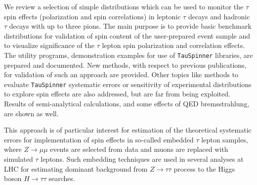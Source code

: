 \documentclass{article}
\begin{document}
\begin{titlepage}

We review a selection of simple distributions which can be used to monitor the $\tau$ spin effects
(polarization and spin correlations) in leptonic $\tau$ decays and hadronic $\tau$ decays with up to three pions. The main 
purpose is to provide basic benchmark 
distributions for validation of spin content of the user-prepared event sample
and to visualize significance of the $\tau$ lepton spin polarization and correlation effects. 
The utility programs, demonstration examples for use of {\tt TauSpinner} libraries, are prepared and documented. 
New methods, with respect to previous publications, for validation of such an approach are provided.
Other topics like methods to evaluate {\tt TauSpinner} systematic errors 
or sensitivity of experimental distributions to 
explore spin effects are also addressed, but are far from being exploited.
Results of semi-analytical calculations, and some  effects of QED bremsstrahlung, are shown as well. 


This approach is of particular interest for estimation of the theoretical systematic 
errors for implementation of spin effects in so-called embedded $\tau$ lepton samples,
where $ Z \to \mu \mu$ events are selected from data and muons are replaced with simulated $\tau$ leptons.
Such embedding techniques are used in several analyses at LHC for estimating dominant background 
from $Z \to \tau \tau$ process to the Higgs boson $H \to \tau \tau$  searches. 



\end{titlepage}
\end{document}
